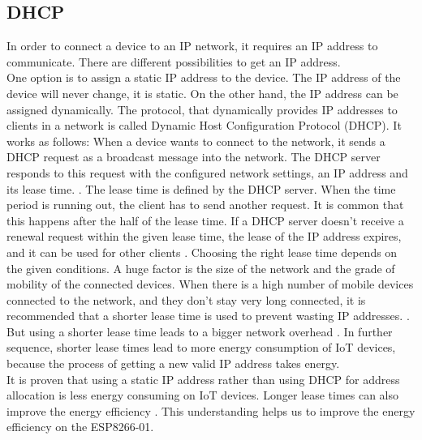\subsection{DHCP}
In order to connect a device to an IP network, it requires an IP address to communicate.
There are different possibilities to get an IP address.\\ 
One option is to assign a static IP address to the device. The IP address of the device will never change, it is static. 
On the other hand, the IP address can be assigned dynamically.
The protocol, that dynamically provides IP addresses to clients in a network is called Dynamic Host Configuration Protocol (DHCP).
It works as follows: When a device wants to connect to the network, it sends a DHCP request as a broadcast message into the network. 
The DHCP server responds to this request with the configured network settings, an IP address and its lease time. \cite{droms1997rfc2131}.
The lease time is defined by the DHCP server. When the time period is running out, the client has to send another request. 
It is common that this happens after the half of the lease time.
If a DHCP server doesn't receive a renewal request within the given lease time, the lease of the IP address expires, and it can be used for other clients \cite{10.1145/1298306.1298315}.
Choosing the right lease time depends on the given conditions. A huge factor is the size of the network and the grade of mobility of the connected devices. 
When there is a high number of mobile devices connected to the network, and they don't stay very long connected, it is recommended that a shorter lease time is used to prevent wasting IP addresses. \cite{khadilkar2007usage}.
But using a shorter lease time leads to a bigger network overhead \cite{li_how_2018}. 
In further sequence, shorter lease times lead to more energy consumption of IoT devices, because the process of getting a new valid IP address takes energy.\\
It is proven that using a static IP address rather than using DHCP for address allocation is less energy consuming on IoT devices. 
Longer lease times can also improve the energy efficiency \cite{department_of_computer_engineering_mehmet_akif_ersoy_university_faculty_of_engineering_and_architecture_burdur_turkey_power_2020}. 
This understanding helps us to improve the energy efficiency on the ESP8266-01.



